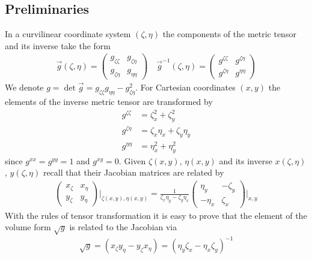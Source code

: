 \subsection{Preliminaries} \label{sec:preliminaries}
In a curvilinear
coordinate system $(\zeta,\eta)$ the components of the metric tensor and its inverse
take the form 
\begin{align}
  \vec g(\zeta,\eta) = \begin{pmatrix}
    g_{\zeta\zeta} & g_{\zeta\eta}  \\
    g_{\zeta\eta} & g_{\eta\eta}  
  \end{pmatrix}
  \quad
  \vec g^{-1}(\zeta,\eta) = \begin{pmatrix}
    g^{\zeta\zeta} & g^{\zeta\eta}  \\
    g^{\zeta\eta} & g^{\eta\eta}  
  \end{pmatrix}
  \label{}
\end{align}
We denote $g = \det{\vec g} = g_{\zeta\zeta}g_{\eta\eta}-g_{\zeta\eta}^2$.
For Cartesian coordinates $(x,y)$ the elements of the inverse metric tensor are 
transformed by
\begin{subequations}
\begin{align}
  g^{\zeta\zeta} &=  \zeta_x^2+\zeta_y^2\\
  g^{\zeta\eta} &=  \zeta_x \eta_x+\zeta_y \eta_y\\
  g^{\eta\eta} &=  \eta_x^2+\eta_y^2
  \label{}
\end{align}
\end{subequations}
since $g^{xx}=g^{yy}=1$ and $g^{xy}=0$. 
Given $\zeta(x,y)$, $\eta(x,y)$ and its inverse $x(\zeta,\eta)$, $y(\zeta,\eta)$ recall that their Jacobian matrices are related by
\begin{align}
  \begin{pmatrix}
    x_\zeta & x_\eta \\
    y_\zeta & y_\eta
  \end{pmatrix} \bigg\rvert_{\zeta(x,y),\eta(x,y)}
  =
  \frac{1}{\zeta_x\eta_y - \zeta_y\eta_x }\begin{pmatrix}
    \eta_y & -\zeta_y \\
    -\eta_x & \zeta_x
  \end{pmatrix}\bigg\rvert_{x,y} 
  \label{eq:inverse}
\end{align}
With the rules of tensor transformation it is easy to prove that the element of the volume form $\sqrt{g}$ is related to the Jacobian via
\begin{align}
\sqrt{g} = (x_\zeta y_\eta-y_\zeta x_\eta) = (\eta_y\zeta_x -\eta_x\zeta_y)^{-1}
  \label{eq:vol}
\end{align}
